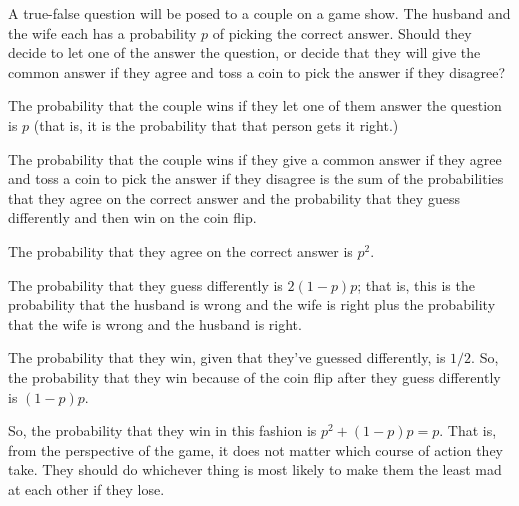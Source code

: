 \begin{problem}[Handout 4, \# 12]
  A true-false question will be posed to a couple on a game show. The
  husband and the wife each has a probability \(p\) of picking the correct
  answer. Should they decide to let one of the answer the question, or
  decide that they will give the common answer if they agree and toss a
  coin to pick the answer if they disagree?
\end{problem}
\begin{solution}
  The probability that the couple wins if they let one of them answer the
  question is $p$ (that is, it is the probability that that person gets it
  right.)

  The probability that the couple wins if they give a common answer if they
  agree and toss a coin to pick the answer if they disagree is the sum of
  the probabilities that they agree on the correct answer and the
  probability that they guess differently and then win on the coin flip.

  The probability that they agree on the correct answer is $p^2$.

  The probability that they guess differently is $2(1-p)p$; that is, this
  is the probability that the husband is wrong and the wife is right plus
  the probability that the wife is wrong and the husband is right.

  The probability that they win, given that they've guessed differently, is
  $1/2$. So, the probability that they win because of the coin flip after
  they guess differently is $(1-p)p$.

  So, the probability that they win in this fashion is $p^2 + (1-p)p = p$.
  That is, from the perspective of the game, it does not matter which
  course of action they take. They should do whichever thing is most likely
  to make them the least mad at each other if they lose.
\end{solution}
\newpage


